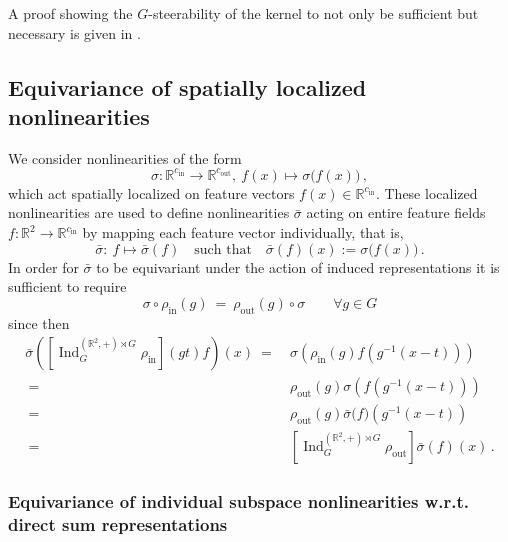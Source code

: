 \documentclass{article}
\begin{document}
A proof showing the $G$-steerability of the kernel to not only be sufficient but necessary is given in \cite{3d_steerableCNNs}.









\vspace*{4ex}

\subsection{Equivariance of spatially localized nonlinearities}
\label{apx:equivariance_nonlin}

We consider nonlinearities of the form
\[
    \sigma:\mathbb{R}^{c_\text{in}}\to\mathbb{R}^{c_\text{out}},\ f(x)\mapsto\sigma\big(f(x)\big) \,,
\]
which act spatially localized on feature vectors $f(x)\in\mathbb{R}^{c_\text{in}}$.
These localized nonlinearities are used to define nonlinearities $\bar{\sigma}$ acting on entire feature fields $f:\mathbb{R}^2\to\mathbb{R}^{c_\text{in}}$ by mapping each feature vector individually, that is,
\[
    \bar\sigma:\ f\mapsto\bar\sigma(f) \quad\text{such that}\quad \bar\sigma(f)(x):=\sigma\big(f(x)\big) \,.
\]
In order for $\bar\sigma$ to be equivariant under the action of induced representations it is sufficient to require
\[
    \sigma\circ\rho_\text{in}(g)\ =\ \rho_\text{out}(g)\circ\sigma \qquad\forall g\in G
\]
since then
\begin{align*}
    \bar\sigma\left( \left[\operatorname{Ind}_G^{(\mathbb{R}^2,+)\rtimes G}\rho_\text{in}\right](gt)f \right)(x)
    \ =&\ \sigma\left( \rho_\text{in}(g) f(g^{-1}(x-t)) \right) \\
    \ =&\ \rho_\text{out}(g) \sigma\left( f(g^{-1}(x-t)) \right) \\
    \ =&\ \rho_\text{out}(g) \bar\sigma\big(f\big)(g^{-1}(x-t)) \\
    \ =&\ \left[\operatorname{Ind}_G^{(\mathbb{R}^2,+)\rtimes G}\rho_\text{out}\right] \bar\sigma(f)(x) \,.
\end{align*}






\subsubsection{Equivariance of individual subspace nonlinearities w.r.t. direct sum representations}
\label{apx:equivariance_direct_sum}
\end{document}
